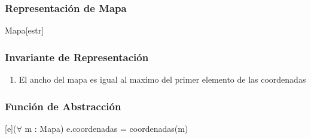 \begin{Representacion}
\subsubsection{Representación de Mapa}
	\begin{Estructura}{Mapa}[estr]
		\begin{Tupla}[estr]
		\end{Tupla}
	\end{Estructura}
	
\subsubsection{Invariante de Representación}
	\begin{enumerate}
		\item El ancho del mapa es igual al maximo del primer elemento de las coordenadas
	\end{enumerate}

\subsubsection{Funci\'on de Abstracci\'on}
	{($\forall$ m : Mapa) e.coordenadas = coordenadas(m)}

\end{Representacion}

